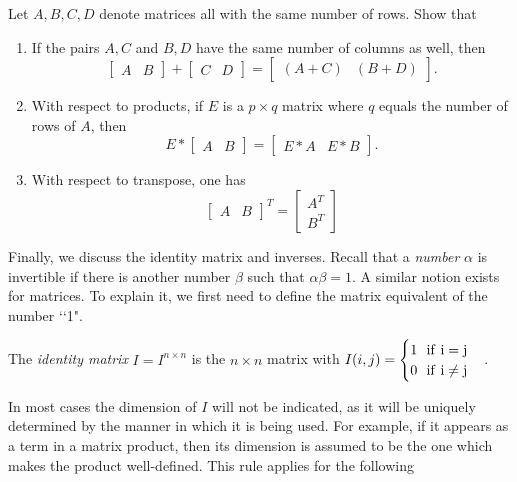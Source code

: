 \documentclass{ximera}
\begin{document}
\begin{exercise} Let $A, B, C, D$ denote matrices all with the same number of rows. Show that
\begin{enumerate}
\item If the pairs $A,C$ and $B,D$ have the same number of columns as well, then
\[
\begin{bmatrix} A & B\end{bmatrix} + \begin{bmatrix} C & D\end{bmatrix} = \begin{bmatrix} (A+C) & (B+D)\end{bmatrix}.
\]
\item With respect to products, if $E$ is a $p\times q$ matrix where $q$ equals the number of rows of $A$, then
\[
E*\begin{bmatrix} A & B\end{bmatrix} = \begin{bmatrix} E*A & E*B\end{bmatrix}.
\]
\item With respect to transpose, one has
\[
\begin{bmatrix} A & B\end{bmatrix}^T = \begin{bmatrix} A^T \\ B^T\end{bmatrix}
\]
\end{enumerate}
\end{exercise}

Finally, we discuss the identity matrix and inverses. Recall that a {\it number} $\alpha$ is invertible if there is another number $\beta$ such that $\alpha\beta = 1$. A similar notion exists for matrices. To explain it, we first need to define the matrix equivalent of the number \lq\lq 1".

\begin{definition} The {\it identity matrix} $I = I^{n\times n}$ is the $n\times n$ matrix with $I(i,j) = \begin{cases}1\ \ \rm{if}\ i=j\\0\ \ \rm{if}\ i\ne j\end{cases}$.
\end{definition}

In most cases the dimension of $I$ will not be indicated, as it will be uniquely determined by the manner in which it is being used. For example, if it appears as a term in a matrix product, then its dimension is assumed to be the one which makes the product well-defined. This rule applies for the following 
\end{document}
